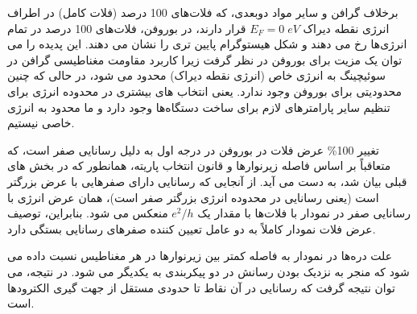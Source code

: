 برخلاف گرافن و سایر مواد دوبعدی، که فلات‌های 100 درصد (فلات کامل) در اطراف انرژی نقطه دیراک $E_F = 0\; eV$ قرار دارند، در بوروفن، فلات‌های 100 درصد در تمام انرژی‌ها رخ می دهند و شکل هیستوگرام پایین تری را نشان می دهند. این پدیده را می توان یک مزیت برای بوروفن در نظر گرفت زیرا کاربرد مقاومت مغناطیسی گرافن در سوئیچینگ به انرژی خاص (انرژی نقطه دیراک) محدود می شود، در حالی که چنین محدودیتی برای بوروفن وجود ندارد. یعنی انتخاب های بیشتری در محدوده انرژی برای تنظیم سایر پارامترهای لازم برای ساخت دستگاه‌ها وجود دارد و ما محدود به انرژی خاصی نیستیم.

تغییر 100\% عرض فلات در بوروفن در درجه اول به دلیل رسانایی  صفر است، که متعاقباً بر اساس فاصله زیر‌نوارها و قانون انتخاب پاریته، همانطور که در بخش های قبلی بیان شد، به دست می آید. از آنجایی که رسانایی دارای صفرهایی با عرض بزرگتر است (یعنی رسانایی در محدوده انرژی بزرگتر صفر است)، همان عرض انرژی با رسانایی صفر در نمودار  با فلات‌ها با مقدار یک $e^2/h$ منعکس می شود. بنابراین، توصیف عرض فلات نمودار  کاملاً به دو عامل تعیین کننده صفرهای رسانایی بستگی دارد. 

علت دره‌ها در نمودار  به فاصله کمتر بین زیر‌نوارها در هر مغناطیس نسبت داده می شود که منجر به نزدیک بودن رسانش در دو پیکربندی به یکدیگر می شود. در نتیجه، می توان نتیجه گرفت که رسانایی در آن نقاط تا حدودی مستقل از جهت گیری الکترودها است.
